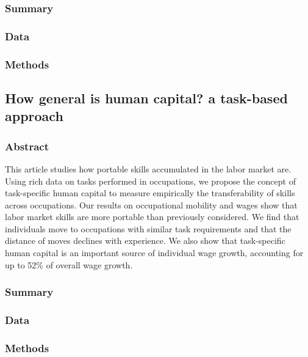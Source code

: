 \documentclass[12pt]{article}
\begin{document}
\subsubsection*{Summary}

\subsubsection*{Data}

\subsubsection*{Methods}


\subsection*{How general is human capital? a task-based approach\cite{how_general_is_human_capital}}

\subsubsection*{Abstract}
This article studies how portable skills accumulated in the labor market are. Using rich data on tasks performed in occupations, we propose the concept of task-specific human capital to measure empirically the transferability of skills across occupations. Our results on occupational mobility and wages show that labor market skills are more portable than previously considered. We find that individuals move to occupations with similar task requirements and that the distance of moves declines with experience. We also show that task-specific human capital is an important source of individual wage growth, accounting for up to 52\% of overall wage growth.
\subsubsection*{Summary}

\subsubsection*{Data}

\subsubsection*{Methods}


\end{document}
